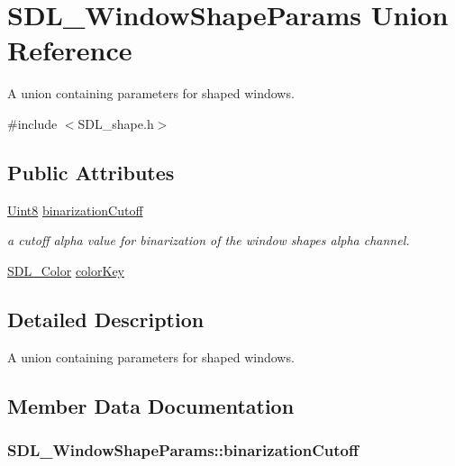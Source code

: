 \hypertarget{union_s_d_l___window_shape_params}{}\section{S\+D\+L\+\_\+\+Window\+Shape\+Params Union Reference}
\label{union_s_d_l___window_shape_params}


A union containing parameters for shaped windows.  




{\ttfamily \#include $<$S\+D\+L\+\_\+shape.\+h$>$}

\subsection*{Public Attributes}
\begin{DoxyCompactItemize}
\item 
\hyperlink{_s_d_l__stdinc_8h_a2944638813a090aa23e62f4da842c3e2}{Uint8} \hyperlink{union_s_d_l___window_shape_params_a534c40b09588a8075c0a70227753dc56}{binarization\+Cutoff}
\begin{DoxyCompactList}\small\item\em a cutoff alpha value for binarization of the window shape\textquotesingle{}s alpha channel. \end{DoxyCompactList}\item 
\hyperlink{struct_s_d_l___color}{S\+D\+L\+\_\+\+Color} \hyperlink{union_s_d_l___window_shape_params_a8bf3e442a51a1bbf452cfec7c1ed5318}{color\+Key}
\end{DoxyCompactItemize}


\subsection{Detailed Description}
A union containing parameters for shaped windows. 

\subsection{Member Data Documentation}
\subsubsection[{\texorpdfstring{binarization\+Cutoff}{binarizationCutoff}}]{ S\+D\+L\+\_\+\+Window\+Shape\+Params\+::binarization\+Cutoff}\hypertarget{union_s_d_l___window_shape_params_a534c40b09588a8075c0a70227753dc56}{}\label{union_s_d_l___window_shape_params_a534c40b09588a8075c0a70227753dc56}


